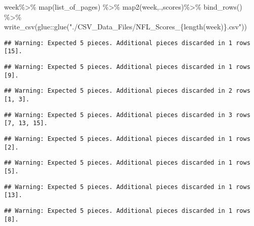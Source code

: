 \documentclass[
]{article}
\newenvironment{Shaded}{\begin{snugshade}}{\end{snugshade}}
\newcommand{\FunctionTok}[1]{\textcolor[rgb]{0.00,0.00,0.00}{#1}}
\newcommand{\NormalTok}[1]{#1}
\newcommand{\SpecialCharTok}[1]{\textcolor[rgb]{0.00,0.00,0.00}{#1}}
\newcommand{\StringTok}[1]{\textcolor[rgb]{0.31,0.60,0.02}{#1}}
\begin{document}
\begin{Shaded}
\begin{Highlighting}[]
\NormalTok{week}\SpecialCharTok{\%\textgreater{}\%}
  \FunctionTok{map}\NormalTok{(list\_of\_pages) }\SpecialCharTok{\%\textgreater{}\%} 
  \FunctionTok{map2}\NormalTok{(week,.,scores)}\SpecialCharTok{\%\textgreater{}\%}
  \FunctionTok{bind\_rows}\NormalTok{() }\SpecialCharTok{\%\textgreater{}\%} 
  \FunctionTok{write\_csv}\NormalTok{(glue}\SpecialCharTok{::}\FunctionTok{glue}\NormalTok{(}\StringTok{"./CSV\_Data\_Files/NFL\_Scores\_\{length(week)\}.csv"}\NormalTok{))}
\end{Highlighting}
\end{Shaded}

\begin{verbatim}
## Warning: Expected 5 pieces. Additional pieces discarded in 1 rows [15].
\end{verbatim}

\begin{verbatim}
## Warning: Expected 5 pieces. Additional pieces discarded in 1 rows [9].
\end{verbatim}

\begin{verbatim}
## Warning: Expected 5 pieces. Additional pieces discarded in 2 rows [1, 3].
\end{verbatim}

\begin{verbatim}
## Warning: Expected 5 pieces. Additional pieces discarded in 3 rows [7, 13, 15].
\end{verbatim}

\begin{verbatim}
## Warning: Expected 5 pieces. Additional pieces discarded in 1 rows [2].
\end{verbatim}

\begin{verbatim}
## Warning: Expected 5 pieces. Additional pieces discarded in 1 rows [5].
\end{verbatim}

\begin{verbatim}
## Warning: Expected 5 pieces. Additional pieces discarded in 1 rows [13].
\end{verbatim}

\begin{verbatim}
## Warning: Expected 5 pieces. Additional pieces discarded in 1 rows [8].
\end{verbatim}
\end{document}
